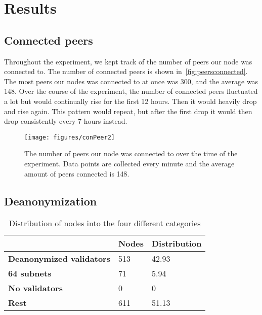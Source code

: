\section{Results}\label{sec:results}

\subsection{Connected peers}\label{subsec:connected-peers}
Throughout the experiment, we kept track of the number of peers our node was connected to.
The number of connected peers is shown in~\autoref{fig:peersconnected}.
The most peers our nodes was connected to at once was 300, and the average was 148.
Over the course of the experiment, the number of connected peers fluctuated a lot but would continually rise for the first 12 hours.
Then it would heavily drop and rise again.
This pattern would repeat, but after the first drop it would then drop consistently every 7 hours instead.

\begin{figure*}[!ht]
    \texttt{[image: figures/conPeer2]}
    \caption{The number of peers our node was connected to over the time of the experiment.
    Data points are collected every minute and the average amount of peers connected is 148.}
    \label{fig:peersconnected}
\end{figure*}

\subsection{Deanonymization}\label{subsec:deanonymization}


\begin{table}[]
    \centering
    \caption{Distribution of nodes into the four different categories}
    \begin{tabular}{|l|l|l|}
        \hline
        & \textbf{Nodes} & \textbf{Distribution} \\ \hline
        \textbf{Deanonymized validators} & 513            & 42.93                 \\ \hline
        \textbf{64 subnets}              & 71             & 5.94                  \\ \hline
        \textbf{No validators}           & 0              & 0                     \\ \hline
        \textbf{Rest}                    & 611            & 51.13                 \\ \hline
    \end{tabular}
    \label{tab:distribution}
\end{table}


